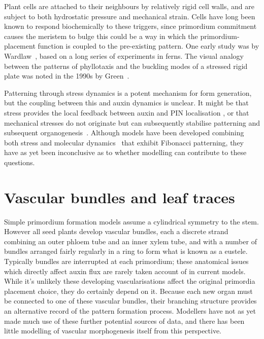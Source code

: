 Plant cells are attached to their neighbours by relatively rigid cell walls, and are subject to both hydrostatic pressure and mechanical strain. Cells have long been known to respond biochemically to these triggers, since primordium commitment causes the meristem to bulge this could be a way in which the primordium-placement function is coupled to the pre-existing pattern. 
 One early study was by Wardlaw~\autocite{wardlawPhyllotaxisOrganogenesisFerns1949}, based on a long series of experiments in ferns.  The visual analogy between the patterns of phyllotaxis and the buckling modes of a stressed rigid plate was noted in the 1990s by Green~\cite{greenPhyllotacticPatternsCharacterization1987}.  
 
  Patterning through stress dynamics is a potent mechanism for form generation,  but the coupling between this and auxin dynamics is unclear.  It might be that stress provides the local feedback between auxin and PIN localisation \autocite{heislerAlignmentPIN1Polarity2010},
   or that mechanical stresses do not originate but can subsequently stabilise patterning and  subsequent organogenesis~\autocite{kuhlemeierPhyllotaxis2017}.  Although models have been developed combining both stress and molecular dynamics~\autocite{pennybackerPhyllotaxisProgressStory2015} that exhibit Fibonacci patterning, they have as yet been inconclusive as to whether modelling can contribute to  these questions.
 
\section{Vascular bundles and leaf traces}
Simple primordium formation models assume a cylindrical symmetry to the stem. However all seed plants develop vascular bundles, each a discrete strand combining an outer phloem tube and an inner xylem tube, and with a number of bundles arranged fairly regularly in a ring to form what is known as a eustele. Typically bundles are interrupted at each primordium; these anatomical issues which directly affect auxin flux are rarely taken account of in current models. While it's unlikely these developing vascularisations affect the original primordia placement choice, they do certainly depend on it. Because each new organ must be connected to one of these vascular bundles, their branching structure provides an alternative record of the pattern formation process. 
Modellers have not as yet made much use of these further potential sources of data, and  there has been little modelling of vascular morphogenesis itself from this perspective.
	
